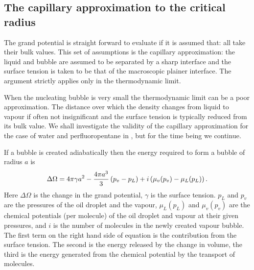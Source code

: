\subsection{The capillary approximation to the critical radius}\label{sec:nuc:capillary}

%
The grand potential is straight forward to evaluate if it is assumed that:
all take their bulk values.
This set of assumptions is the capillary approximation:
the liquid and bubble are assumed to be separated by a sharp interface and
the surface tension is taken to be that of the macroscopic plainer interface.
The argument strictly applies only in the thermodynamic limit.

When the nucleating bubble is very small the thermodynamic limit can be a poor approximation\cite{Talanquer1995}.
The distance over which the density changes from liquid to vapour if often not insignificant %
and the surface tension is typically reduced from its bulk value\cite{Kiang1971}.
We shall investigate the validity of the capillary approximation for the case of water and perfluoropentane in , 
but for the time being we continue.



If a bubble is created adiabatically then the energy required to form a bubble of radius $a$ is  \cite{Delale2003, Katz1973}
\begin{align}
  \Delta \Omega =4\pi \gamma  a^2 - \frac{4\pi a^3}{3}\left( p_v - p_L \right) + i\left( \mu_v(p_v) - \mu_L(p_L) \right).\label{eqn:DeltaG}
\end{align}
Here $\Delta \Omega$ is the change in the grand potential, $\gamma$ is the surface tension.
$p_L$ and $p_v$ are the pressures of the oil droplet and the vapour,
 $\mu_L(p_L)$ and $\mu_v(p_v)$ are the chemical potentials (per molecule) of the oil droplet and vapour
at their given pressures,
and $i$ is the number of molecules in the newly created vapour bubble.
The first term on the right hand side of equation  is the contribution from the surface tension.
The second is the energy released by the change in volume,
the third is the energy generated from  the chemical potential by the transport of molecules.



